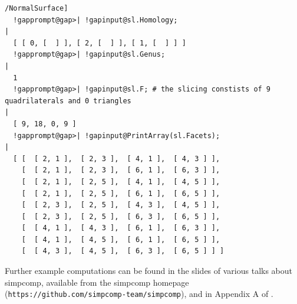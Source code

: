 \documentclass[a4paper,11pt]{report}
\begin{document}
{{\begin{Verbatim}[commandchars=!@|,fontsize=\small,frame=single,label=Example]
  /NormalSurface]
  !gapprompt@gap>| !gapinput@sl.Homology;
|
  [ [ 0, [  ] ], [ 2, [  ] ], [ 1, [  ] ] ]
  !gapprompt@gap>| !gapinput@sl.Genus;
|
  1
  !gapprompt@gap>| !gapinput@sl.F; # the slicing constists of 9 quadrilaterals and 0 triangles
|
  [ 9, 18, 0, 9 ]
  !gapprompt@gap>| !gapinput@PrintArray(sl.Facets);
|
  [ [  [ 2, 1 ],  [ 2, 3 ],  [ 4, 1 ],  [ 4, 3 ] ],
    [  [ 2, 1 ],  [ 2, 3 ],  [ 6, 1 ],  [ 6, 3 ] ],
    [  [ 2, 1 ],  [ 2, 5 ],  [ 4, 1 ],  [ 4, 5 ] ],
    [  [ 2, 1 ],  [ 2, 5 ],  [ 6, 1 ],  [ 6, 5 ] ],
    [  [ 2, 3 ],  [ 2, 5 ],  [ 4, 3 ],  [ 4, 5 ] ],
    [  [ 2, 3 ],  [ 2, 5 ],  [ 6, 3 ],  [ 6, 5 ] ],
    [  [ 4, 1 ],  [ 4, 3 ],  [ 6, 1 ],  [ 6, 3 ] ],
    [  [ 4, 1 ],  [ 4, 5 ],  [ 6, 1 ],  [ 6, 5 ] ],
    [  [ 4, 3 ],  [ 4, 5 ],  [ 6, 3 ],  [ 6, 5 ] ] ]
\end{Verbatim}
}

 Further example computations can be found in the slides of various talks about \textsf{simpcomp}, available from the \textsf{simpcomp} homepage (\texttt{https://github.com/simpcomp-team/simpcomp}), and in Appendix A of \cite{Spreer10Diss}. }

 
\end{document}
